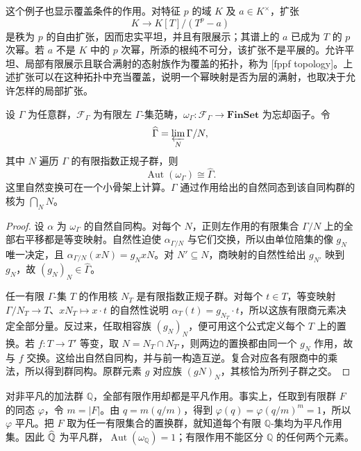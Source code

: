 这个例子也显示覆盖条件的作用。对特征 \(p\) 的域 \(K\) 及 \(a\in K^\times\)，扩张
\[
	K\longrightarrow K[T]/(T^p-a)
\]
是秩为 \(p\) 的自由扩张，因而忠实平坦，并且有限展示；其谱上的 \(a\) 已成为 \(T\) 的 \(p\) 次幂。若 \(a\) 不是 \(K\) 中的 \(p\) 次幂，所添的根纯不可分，该扩张不是平展的。允许平坦、局部有限展示且联合满射的态射族作为覆盖的拓扑，称为 [fppf topology]。上述扩张可以在这种拓扑中充当覆盖，说明一个幂映射是否为层的满射，也取决于允许怎样的局部扩张。

\begin{proposition}\label{b4:prop:C-abstract-fiber-completion}
	设 \(\Gamma\) 为任意群，\(\mathcal F_\Gamma\) 为有限左 \(\Gamma\)-集范畴，\(\omega_\Gamma:\mathcal F_\Gamma\to\mathbf{FinSet}\) 为忘却函子。令
	\[
		\widehat\Gamma=\varprojlim_N\Gamma/N,
	\]
	其中 \(N\) 遍历 \(\Gamma\) 的有限指数正规子群，则
	\[
		\operatorname{Aut}(\omega_\Gamma)\cong\widehat\Gamma.
	\]
	这里自然变换可在一个小骨架上计算。\(\Gamma\) 通过作用给出的自然同态到该自同构群的核为 \(\bigcap_NN\)。
\end{proposition}
\begin{proof}
	设 \(\alpha\) 为 \(\omega_\Gamma\) 的自然自同构。对每个 \(N\)，正则左作用的有限集合 \(\Gamma/N\) 上的全部右平移都是等变映射。自然性迫使 \(\alpha_{\Gamma/N}\) 与它们交换，所以由单位陪集的像 \(g_N\) 唯一决定，且 \(\alpha_{\Gamma/N}(xN)=g_NxN\)。对 \(N'\subseteq N\)，商映射的自然性给出 \(g_{N'}\) 映到 \(g_N\)，故 \((g_N)_N\in\widehat\Gamma\)。

	任一有限 \(\Gamma\)-集 \(T\) 的作用核 \(N_T\) 是有限指数正规子群。对每个 \(t\in T\)，等变映射 \(\Gamma/N_T\to T\)、\(xN_T\mapsto x\cdot t\) 的自然性说明 \(\alpha_T(t)=g_{N_T}\cdot t\)，所以这族有限商元素决定全部分量。反过来，任取相容族 \((g_N)_N\)，便可用这个公式定义每个 \(T\) 上的置换。若 \(f:T\to T'\) 等变，取 \(N=N_T\cap N_{T'}\)，则两边的置换都由同一个 \(g_N\) 作用，故与 \(f\) 交换。这给出自然自同构，并与前一构造互逆。复合对应各有限商中的乘法，所以得到群同构。原群元素 \(g\) 对应族 \((gN)_N\)，其核恰为所列子群之交。
\end{proof}

对非平凡的加法群 \(\mathbb Q\)，全部有限作用却都是平凡作用。事实上，任取到有限群 \(F\) 的同态 \(\varphi\)，令 \(m=|F|\)。由 \(q=m(q/m)\)，得到 \(\varphi(q)=\varphi(q/m)^m=1\)，所以 \(\varphi\) 平凡。把 \(F\) 取为任一有限集合的置换群，就知道每个有限 \(\mathbb Q\)-集均为平凡作用集。因此 \(\widehat{\vphantom{Q}\mathbb Q}\) 为平凡群，\(\operatorname{Aut}(\omega_{\mathbb Q})=1\)；有限作用不能区分 \(\mathbb Q\) 的任何两个元素。

